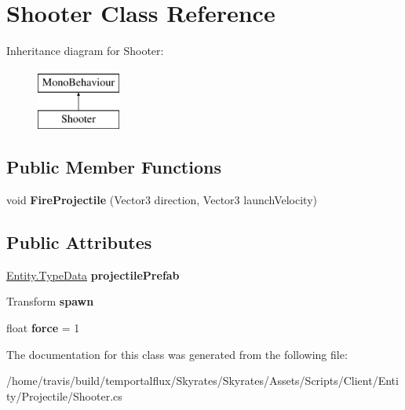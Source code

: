 \hypertarget{class_shooter}{\section{Shooter Class Reference}
\label{class_shooter}
}
Inheritance diagram for Shooter\-:\begin{figure}[H]
\begin{center}
\leavevmode
\includegraphics[height=2.000000cm]{class_shooter}
\end{center}
\end{figure}
\subsection*{Public Member Functions}
\begin{DoxyCompactItemize}
\item 
\hypertarget{class_shooter_a8f6d6c78a0579a73a8833a09b2302996}{void {\bfseries Fire\-Projectile} (Vector3 direction, Vector3 launch\-Velocity)}\label{class_shooter_a8f6d6c78a0579a73a8833a09b2302996}

\end{DoxyCompactItemize}
\subsection*{Public Attributes}
\begin{DoxyCompactItemize}
\item 
\hypertarget{class_shooter_a05fcdc1550191f05db13ebe9405c0b7b}{\hyperlink{class_skyrates_1_1_common_1_1_entity_1_1_entity_1_1_type_data}{Entity.\-Type\-Data} {\bfseries projectile\-Prefab}}\label{class_shooter_a05fcdc1550191f05db13ebe9405c0b7b}

\item 
\hypertarget{class_shooter_a2ace09fc935b67cad5592a578516ec03}{Transform {\bfseries spawn}}\label{class_shooter_a2ace09fc935b67cad5592a578516ec03}

\item 
\hypertarget{class_shooter_ade2928b5b4ff8b037913d71f312cbc38}{float {\bfseries force} = 1}\label{class_shooter_ade2928b5b4ff8b037913d71f312cbc38}

\end{DoxyCompactItemize}


The documentation for this class was generated from the following file\-:\begin{DoxyCompactItemize}
\item 
/home/travis/build/temportalflux/\-Skyrates/\-Skyrates/\-Assets/\-Scripts/\-Client/\-Entity/\-Projectile/Shooter.\-cs\end{DoxyCompactItemize}
